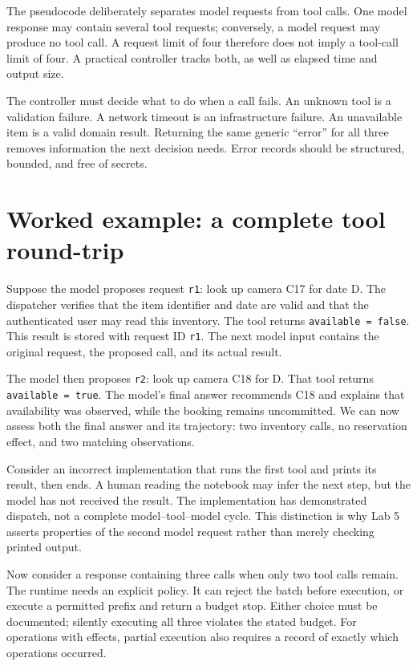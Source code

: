 The pseudocode deliberately separates model requests from tool calls. One model response may contain several tool requests; conversely, a model request may produce no tool call. A request limit of four therefore does not imply a tool-call limit of four. A practical controller tracks both, as well as elapsed time and output size.

The controller must decide what to do when a call fails. An unknown tool is a validation failure. A network timeout is an infrastructure failure. An unavailable item is a valid domain result. Returning the same generic “error” for all three removes information the next decision needs. Error records should be structured, bounded, and free of secrets.

\section{Worked example: a complete tool round-trip}
Suppose the model proposes request \texttt{r1}: look up camera C17 for date D. The dispatcher verifies that the item identifier and date are valid and that the authenticated user may read this inventory. The tool returns \texttt{available = false}. This result is stored with request ID \texttt{r1}. The next model input contains the original request, the proposed call, and its actual result.

The model then proposes \texttt{r2}: look up camera C18 for D. That tool returns \texttt{available = true}. The model's final answer recommends C18 and explains that availability was observed, while the booking remains uncommitted. We can now assess both the final answer and its trajectory: two inventory calls, no reservation effect, and two matching observations.

Consider an incorrect implementation that runs the first tool and prints its result, then ends. A human reading the notebook may infer the next step, but the model has not received the result. The implementation has demonstrated dispatch, not a complete model–tool–model cycle. This distinction is why Lab 5 asserts properties of the second model request rather than merely checking printed output.

Now consider a response containing three calls when only two tool calls remain. The runtime needs an explicit policy. It can reject the batch before execution, or execute a permitted prefix and return a budget stop. Either choice must be documented; silently executing all three violates the stated budget. For operations with effects, partial execution also requires a record of exactly which operations occurred.

